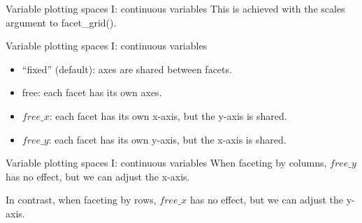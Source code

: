 \documentclass[
  ignorenonframetext,
]{beamer}
\providecommand{\tightlist}{%
  \setlength{\itemsep}{0pt}\setlength{\parskip}{0pt}}
\begin{document}
\begin{frame}{Variable plotting spaces I: continuous variables}
\label{variable-plotting-spaces-i-continuous-variables-1}
This is achieved with the scales argument to facet\_grid().
\end{frame}

\begin{frame}{Variable plotting spaces I: continuous variables}
\label{variable-plotting-spaces-i-continuous-variables-2}
\begin{itemize}
\tightlist
\item
  ``fixed'' (default): axes are shared between facets.
\item
  free: each facet has its own axes.
\item
  \(free\_x\): each facet has its own x-axis, but the y-axis is shared.
\item
  \(free\_y\): each facet has its own y-axis, but the x-axis is shared.
\end{itemize}
\end{frame}

\begin{frame}{Variable plotting spaces I: continuous variables}
\label{variable-plotting-spaces-i-continuous-variables-3}
When faceting by columns, \(free\_y\) has no effect, but we can adjust
the x-axis.

In contrast, when faceting by rows, \(free\_x\) has no effect, but we
can adjust the y-axis.
\end{frame}
\end{document}
